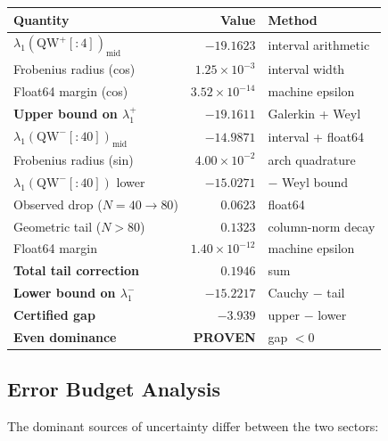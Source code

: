 \documentclass[12pt,a4paper]{article}
\theoremstyle{definition}
\theoremstyle{remark}
\begin{document}
\begin{center}
\renewcommand{\arraystretch}{1.2}
\begin{tabular}{lrl}
\toprule
\textbf{Quantity} & \textbf{Value} & \textbf{Method} \\
\midrule
$\lambda_1(\mathrm{QW}^+[{:}4])_{\mathrm{mid}}$ & $-19.1623$ & interval arithmetic \\
Frobenius radius (cos) & $1.25 \times 10^{-3}$ & interval width \\
Float64 margin (cos) & $3.52 \times 10^{-14}$ & machine epsilon \\
\textbf{Upper bound on $\lambda_1^+$} & $\mathbf{-19.1611}$ & Galerkin + Weyl \\
\midrule
$\lambda_1(\mathrm{QW}^-[{:}40])_{\mathrm{mid}}$ & $-14.9871$ & interval + float64 \\
Frobenius radius (sin) & $4.00 \times 10^{-2}$ & arch quadrature \\
$\lambda_1(\mathrm{QW}^-[{:}40])$ lower & $-15.0271$ & $-$ Weyl bound \\
Observed drop ($N{=}40 \to 80$) & $0.0623$ & float64 \\
Geometric tail ($N{>}80$) & $0.1323$ & column-norm decay \\
Float64 margin & $1.40 \times 10^{-12}$ & machine epsilon \\
\textbf{Total tail correction} & $\mathbf{0.1946}$ & sum \\
\textbf{Lower bound on $\lambda_1^-$} & $\mathbf{-15.2217}$ & Cauchy $-$ tail \\
\midrule
\textbf{Certified gap} & $\mathbf{-3.939}$ & upper $-$ lower \\
\textbf{Even dominance} & \textbf{PROVEN} & gap $< 0$ \\
\bottomrule
\end{tabular}
\end{center}

\subsection{Error Budget Analysis}

The dominant sources of uncertainty differ between the two sectors:
\end{document}
